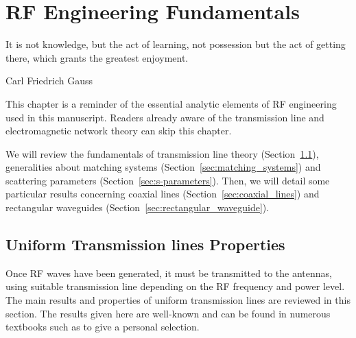 \setchapterpreamble[u]{\margintoc}
\chapter{RF Engineering Fundamentals}\label{chap:RF_fundamentals}


\epigraph{It is not knowledge, but the act of learning, not possession but the act of getting there, which grants the greatest enjoyment.}{Carl Friedrich Gauss}

This chapter is a reminder of the essential analytic elements of RF engineering used in this manuscript. Readers already aware of the transmission line and electromagnetic network theory can skip this chapter.

We will review the fundamentals of transmission line theory (Section~\ref{sec:transmission_line}), generalities about matching systems (Section~\ref{sec:matching_systems}) and scattering parameters (Section~\ref{sec:s-parameters}). Then, we will detail some particular results concerning coaxial lines (Section~\ref{sec:coaxial_lines}) and rectangular waveguides (Section~\ref{sec:rectangular_waveguide}). 

\section[Uniform Transmission Lines]{Uniform Transmission lines Properties}\label{sec:transmission_line}

Once RF waves have been generated, it must be transmitted to the antennas, using suitable transmission line depending on the RF frequency and power level. The main results and properties of uniform transmission lines are reviewed in this section. The results given here are well-known and can be found in numerous textbooks such as  to give a personal selection.

